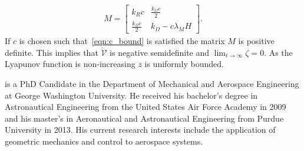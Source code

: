 \documentclass[fleqn]{IJCAS}  %
\begin{document}
\begin{multicols}{2}
\begin{gather*}
	M = \begin{bmatrix}
		k_R c & \frac{k_\Omega c}{2} \\
		\frac{k_\Omega c}{2} & k_\Omega - c \lambda_M H
	\end{bmatrix} .
\end{gather*}
If \( c \) is chosen such that~\cref{eqn:c_bound} is satisfied the matrix \( M \) is positive definite.
This implies that $\dot{\mathcal{V}}$ is negative semidefinite and $\lim_{t\to\infty} \zeta=0$. 
As the Lyapunov function is non-increasing $z$ is uniformly bounded. 
%	
%	

                                  



    {is a PhD Candidate in the Department of Mechanical and Aerospace Engineering at George Washington University. 
    He received his bachelor's degree in Astronautical Engineering from the United States Air Force Academy in 2009 and his master's in Aeronautical and Astronautical Engineering from Purdue University in 2013.
    His current research interests include the application of geometric mechanics and control to aerospace systems. 
    }


\end{multicols}
\end{document}
